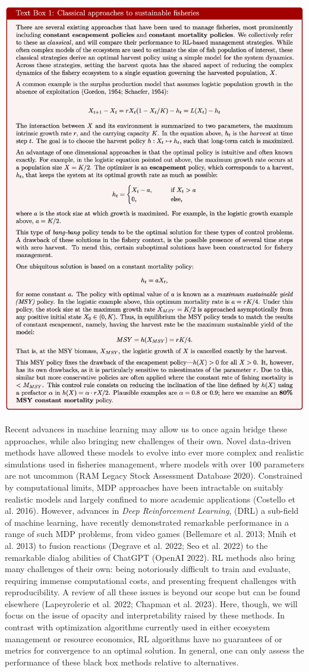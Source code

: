 \documentclass{article}
\begin{document}
\includegraphics[width=1\linewidth]{figures/textbox}

Recent advances in machine learning may allow us to once again bridge
these approaches, while also bringing new challenges of their own. Novel
data-driven methods have allowed these models to evolve into ever more
complex and realistic simulations used in fisheries management, where
models with over 100 parameters are not uncommon (RAM Legacy Stock
Assessment Database 2020). Constrained by computational limits, MDP
approaches have been intractable on suitably realistic models and
largely confined to more academic applications (Costello et al. 2016).
However, advances in \emph{Deep Reinforcement Learning}, (DRL) a
sub-field of machine learning, have recently demonstrated remarkable
performance in a range of such MDP problems, from video games (Bellemare
et al. 2013; Mnih et al. 2013) to fusion reactions (Degrave et al. 2022;
Seo et al. 2022) to the remarkable dialog abilities of ChatGPT (OpenAI
2022). RL methods also bring many challenges of their own: being
notoriously difficult to train and evaluate, requiring immense
computational costs, and presenting frequent challenges with
reproducibility. A review of all these issues is beyond our scope but
can be found elsewhere (Lapeyrolerie et al. 2022; Chapman et al. 2023).
Here, though, we will focus on the issue of opacity and interpretability
raised by these methods. In contrast with optimization algorithms
currently used in either ecosystem management or resource economics, RL
algorithms have no guarantees of or metrics for convergence to an
optimal solution. In general, one can only assess the performance of
these black box methods relative to alternatives.
\end{document}
